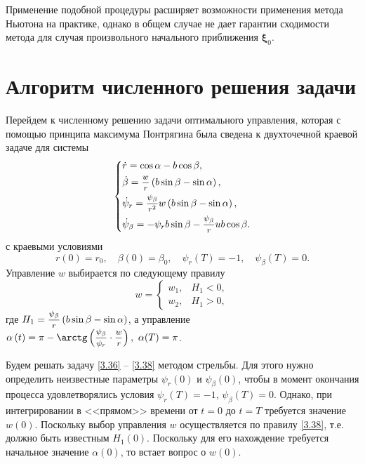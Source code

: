 \documentclass[a4paper,12pt, openany]{book}
\theoremstyle{plain} %
\theoremstyle{definition} %
\theoremstyle{remark} %
\numberwithin{equation}{chapter}
\begin{document}
{Применение подобной процедуры расширяет возможности применения метода Ньютона на практике, однако в общем случае не дает гарантии сходимости метода для случая произвольного начального приближения $\bm\xi_0$. 

\section{Алгоритм численного решения задачи}

Перейдем к численному решению задачи оптимального управления, которая с помощью принципа максимума Понтрягина была сведена к двухточечной краевой задаче для системы 
\begin{equation}\label{3.36}
\left\{ {\begin{aligned}
   &\dot r = \cos \alpha  - b\cos \beta , \hfill  \\
   &\dot \beta  = \mfrac{w}
{r}\left( {b\sin \beta  - \sin \alpha } \right), \hfill  \\
   &\dot \psi _r  = \mfrac{{\psi _\beta  }}
{{r^2 }}w\left( {b\sin \beta  - \sin \alpha } \right), \hfill  \\
   &\dot \psi _\beta   =  - \psi _r b\sin \beta  - \mfrac{{\psi _\beta  }}
{r}ub\cos \beta . \hfill  \\
 \end{aligned} } \right.
\end{equation}
с краевыми условиями
\begin{equation}\label{3.37}
r\left( 0 \right) = r_0, \quad \beta \left( 0 \right) = \beta _0, \quad \psi _r \left( T \right) =  -1, \quad \psi _\beta  \left( T \right) = 0.
\end{equation}
Управление $w$ выбирается по следующему правилу
\begin{equation}\label{3.38}
w = 
\begin{cases}
w_1, & H_1 < 0, \\
w_2, & H_1 > 0, 
\end{cases}
\end{equation}
где $H_1  = \mfrac{{\psi _\beta  }}
{r}\left( {b\sin \beta  - \sin \alpha } \right)$, а управление $\alpha \left( t \right) = \pi - \arctg\left( {\mfrac{{\psi _\beta  }}
{{\psi _r }} \cdot \mfrac{w}
{r}} \right), \,\, \alpha(T) = \pi$.
 
Будем решать задачу \eqref{3.36} -- \eqref{3.38} методом стрельбы. Для этого нужно определить неизвестные параметры $\psi_r(0)$ и $\psi_\beta(0)$, чтобы в момент окончания процесса удовлетворялись условия $\psi_r(T) = -1$, $\psi_\beta(T) = 0$. Однако, при интегрировании в <<прямом>> времени от $t=0$ до $t=T$ требуется значение $w(0)$. Поскольку выбор управления $w$ осуществляется по правилу \eqref{3.38}, т.е. должно быть известным $H_1(0)$. Поскольку для его нахождение требуется начальное значение $\alpha(0)$, то встает вопрос о $w(0)$. 

}
\end{document}
